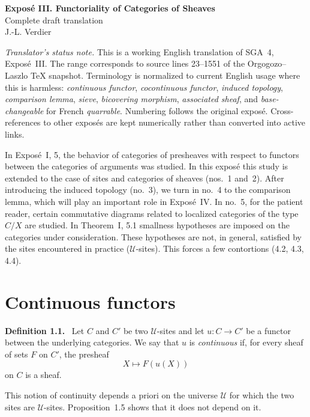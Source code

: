 \documentclass[11pt]{article}
\newcommand{\U}{\mathcal{U}}
\newenvironment{statement}[1]{\par\medskip\noindent\textbf{#1.}\ }{\par\medskip}
\begin{document}
\begin{center}
{\Large \textbf{Expos\'e III. Functoriality of Categories of Sheaves}}\\[0.35em]
{\large Complete draft translation}\\[0.35em]
J.-L. Verdier
\end{center}

\bigskip

\noindent\emph{Translator's status note.} This is a working English translation of SGA~4, Expos\'e~III. The range corresponds to source lines 23--1551 of the Orgogozo--Laszlo TeX snapshot. Terminology is normalized to current English usage where this is harmless: \emph{continuous functor}, \emph{cocontinuous functor}, \emph{induced topology}, \emph{comparison lemma}, \emph{sieve}, \emph{bicov\-ering morphism}, \emph{associated sheaf}, and \emph{base-changeable} for French \emph{quarrable}. Numbering follows the original expos\'e. Cross-references to other expos\'es are kept numerically rather than converted into active links.

\bigskip

In Expos\'e~I, 5, the behavior of categories of presheaves with respect to functors between the categories of arguments was studied. In this expos\'e this study is extended to the case of sites and categories of sheaves (nos.~1 and~2). After introducing the induced topology (no.~3), we turn in no.~4 to the comparison lemma, which will play an important role in Expos\'e~IV. In no.~5, for the patient reader, certain commutative diagrams related to localized categories of the type \(C/X\) are studied. In Theorem~I, 5.1 smallness hypotheses are imposed on the categories under consideration. These hypotheses are not, in general, satisfied by the sites encountered in practice (\(\U\)-sites). This forces a few contortions (4.2, 4.3, 4.4).

\section{Continuous functors}

\begin{statement}{Definition 1.1}
Let \(C\) and \(C'\) be two \(\U\)-sites and let \(u:C\to C'\) be a functor between the underlying categories. We say that \(u\) is \emph{continuous} if, for every sheaf of sets \(F\) on \(C'\), the presheaf
\[
X\longmapsto F(u(X))
\]
on \(C\) is a sheaf.
\end{statement}

This notion of continuity depends a priori on the universe \(\U\) for which the two sites are \(\U\)-sites. Proposition~1.5 shows that it does not depend on it.
\end{document}

